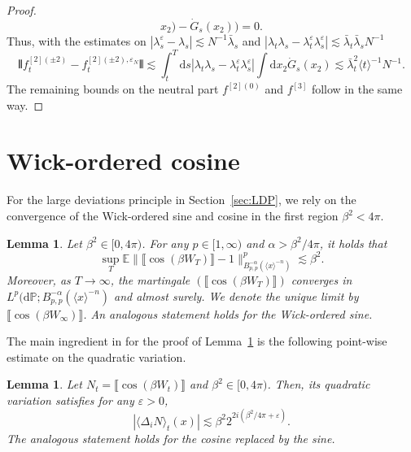 \documentclass[11pt, a4paper]{scrartcl}
\numberwithin{equation}{section}
\theoremstyle{plain}
\newtheorem{lemma}[foo]{Lemma}
\theoremstyle{remark}
\newcommand{\mathd}{\mathrm{d}}
\newcommand{\nobracket}{}
\begin{document}
\begin{proof}
\[        x_2) - \dot{G}_s (x_2)) = 0. \]
     Thus, with the estimates on $| \lambda_s^{\varepsilon} - \lambda_s |
     \lesssim N^{- 1} \bar{\lambda}_s$ and $| \lambda_t \lambda_s -
     \lambda_t^{\varepsilon} \lambda_s^{\varepsilon} | \lesssim \bar{\lambda}_t
     \bar{\lambda}_s N^{- 1}$
     \[ \interleave f^{[2] (\pm 2)}_t - f_t^{[2] (\pm 2), \varepsilon_N}
        \interleave \lesssim \int_t^T \mathd s | \lambda_t \lambda_s -
        \lambda_t^{\varepsilon} \lambda_s^{\varepsilon} |  \int \mathd x_2
        \dot{G}_s (x_2) \lesssim \bar{\lambda}_t^2 \langle t \rangle^{- 1} N^{- 1} . \]
     The remaining bounds on the neutral part $f^{[2] (0)}$ and $f^{[3]}$ follow
     in the same way.
   \end{proof}

\section{Wick-ordered cosine}\label{app:wick-cos}

For the large deviations principle in Section~\ref{sec:LDP}, we rely on the
convergence of the Wick-ordered sine and cosine in the first region $\beta^2 <
4 \pi$.

\begin{lemma}
  \label{lem:wick-conv}Let $\beta^2 \in [0, 4 \pi)$. For any $p \in [1,
  \infty)$ and $\alpha > \beta^2 / 4 \pi$, it holds that
  \[ \sup_T \mathbb{E} \| \llbracket \cos (\beta W_T) \rrbracket - 1 \|_{B_{p,
     p}^{- \alpha} (\langle x \rangle^{- n})}^p \lesssim \beta^2 . \]
  Moreover, as $T \rightarrow \infty$, the martingale $(\llbracket \cos (\beta
  W_T) \rrbracket)$ converges in $L^p (\mathd \mathbb{P} ; B_{p, p}^{- \alpha} (\langle
  x \rangle^{- n}) \nobracket$ and almost surely. We denote the unique limit
  by $\llbracket \cos (\beta W_{\infty}) \rrbracket$. An analogous statement
  holds for the Wick-ordered sine.
\end{lemma}

The main ingredient in for the proof of Lemma~\ref{lem:wick-conv} is the
following point-wise estimate on the quadratic variation.

\begin{lemma}
  \label{lem:variation-bound}Let $N_t = \llbracket \cos (\beta W_t)
  \rrbracket$ and $\beta^2 \in [0, 4 \pi)$. Then, its quadratic variation
  satisfies for any $\varepsilon > 0$,
  \[ | \langle \Delta_i N \rangle_t (x) | \lesssim \beta^2 2^{2 i (\beta^2 / 4
     \pi + \varepsilon)} . \]
  The analogous statement holds for the cosine replaced by the sine.
\end{lemma}
\end{document}
